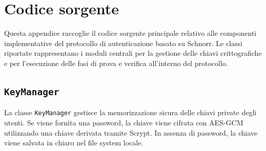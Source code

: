 \appendix
\chapter[APPENDICE]{Codice sorgente}

Questa appendice raccoglie il codice sorgente principale relativo alle componenti
implementative del protocollo di autenticazione basato su Schnorr.  
Le classi riportate rappresentano i moduli centrali per la gestione delle chiavi crittografiche
e per l'esecuzione delle fasi di prova e verifica all'interno del protocollo.

\section{\texttt{KeyManager}}
\label{sec:key_manager}

La classe \texttt{KeyManager} gestisce la memorizzazione sicura delle chiavi private
degli utenti. Se viene fornita una password, la chiave viene cifrata con AES-GCM
utilizzando una chiave derivata tramite Scrypt. In assenza di password, la chiave
viene salvata in chiaro nel file system locale.

